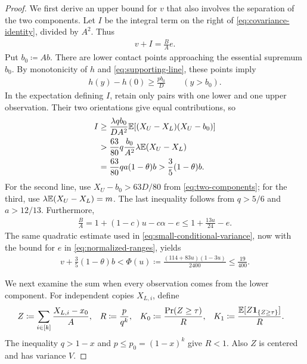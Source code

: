 \begin{proof}
We first derive an upper bound for $v$ that also involves the separation of the two components.
Let $I$ be the integral term on the right of \cref{eq:covariance-identity}, divided by $A^2$.
Thus
\begin{align*}
 v+I=\frac BAe.
\end{align*}
Put $b_0\coloneqq Ab$.
There are lower contact points approaching the essential supremum $b_0$.
By monotonicity of $h$ and \cref{eq:supporting-line}, these points imply
\begin{align*}
 h(y)-h(0)\ge\frac{pb_0}{D}\qquad(y>b_0).
\end{align*}
In the expectation defining $I$, retain only pairs with one lower and one upper observation.
Their two orientations give equal contributions, so
\begin{align*}
 I
 &\ge\frac{\lambda q b_0}{DA^2}
       \mathbb E[(X_U-X_L)(X_U-b_0)]\\
 &>\frac{63}{80}q\frac{b_0}{A^2}\lambda\mathbb E(X_U-X_L)\\
 &=\frac{63}{80}qa(1-\theta)b
 >\frac35(1-\theta)b.
\end{align*}
For the second line, use $X_U-b_0>63D/80$ from \cref{eq:two-components}; for the third, use $\lambda\mathbb E(X_U-X_L)=m$.
The last inequality follows from $q>5/6$ and $a>12/13$.
Furthermore,
\begin{align*}
 \frac BA=1+(1-c)u-c\alpha-e\le1+\frac{13u}{24}-e.
\end{align*}
The same quadratic estimate used in \cref{eq:small-conditional-variance}, now with the bound for $e$ in \cref{eq:normalized-ranges}, yields
\begin{align}
 v+\frac35(1-\theta)b
 <\Phi(u)\coloneqq\frac{(114+83u)(1-3u)}{2400}
 \le\frac{19}{400}.
 \label{eq:normalized-variance-upper}
\end{align}

We next examine the sum when every observation comes from the lower component.
For independent copies $X_{L,i}$, define
\begin{align}
 Z&\coloneqq\sum_{i\in[k]}\frac{X_{L,i}-x_0}{A},
 &R&\coloneqq\frac p{q^k},
 &K_0&\coloneqq\frac{\Pr(Z\ge\tau)}R,
 &K_1&\coloneqq\frac{\mathbb E[Z\mathbf 1_{\{Z\ge\tau\}}]}R.
 \label{eq:lower-tail-quantities}
\end{align}
The inequality $q>1-x$ and $p\le p_0=(1-x)^k$ give $R<1$.
Also $Z$ is centered and has variance $V$.


\end{proof}
